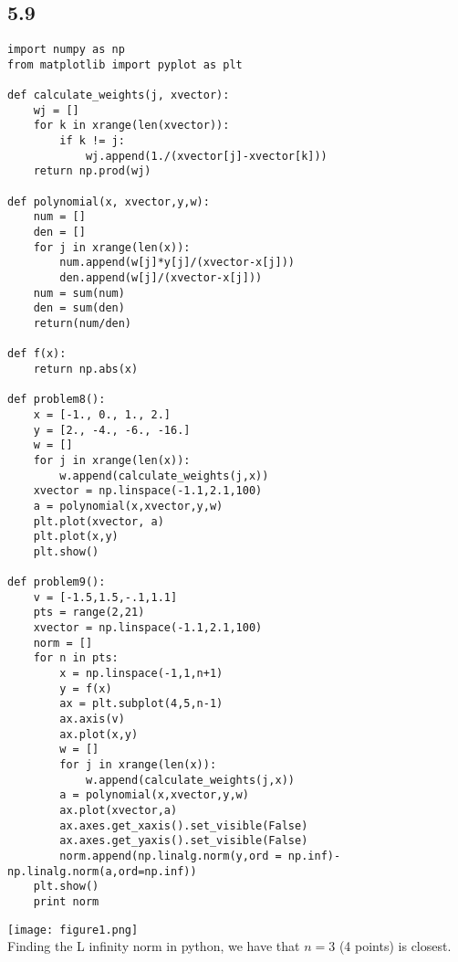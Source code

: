 \documentclass[letterpaper,12pt]{article}
\theoremstyle{definition}
\begin{document}
\subsection*{5.9}
\begin{lstlisting}
import numpy as np
from matplotlib import pyplot as plt

def calculate_weights(j, xvector):
    wj = []
    for k in xrange(len(xvector)):
        if k != j:
            wj.append(1./(xvector[j]-xvector[k]))
    return np.prod(wj)

def polynomial(x, xvector,y,w):
    num = []
    den = []
    for j in xrange(len(x)):
        num.append(w[j]*y[j]/(xvector-x[j]))
        den.append(w[j]/(xvector-x[j]))
    num = sum(num)
    den = sum(den)
    return(num/den)

def f(x):
    return np.abs(x)

def problem8():
    x = [-1., 0., 1., 2.]
    y = [2., -4., -6., -16.]
    w = []
    for j in xrange(len(x)):
        w.append(calculate_weights(j,x))
    xvector = np.linspace(-1.1,2.1,100)
    a = polynomial(x,xvector,y,w)
    plt.plot(xvector, a)
    plt.plot(x,y)
    plt.show()

def problem9():
    v = [-1.5,1.5,-.1,1.1]
    pts = range(2,21)
    xvector = np.linspace(-1.1,2.1,100)
    norm = []
    for n in pts:
        x = np.linspace(-1,1,n+1)
        y = f(x)
        ax = plt.subplot(4,5,n-1)
        ax.axis(v)
        ax.plot(x,y)
        w = []
        for j in xrange(len(x)):
            w.append(calculate_weights(j,x))
        a = polynomial(x,xvector,y,w)
        ax.plot(xvector,a)
        ax.axes.get_xaxis().set_visible(False)
        ax.axes.get_yaxis().set_visible(False)
        norm.append(np.linalg.norm(y,ord = np.inf)-np.linalg.norm(a,ord=np.inf))
    plt.show()
    print norm
\end{lstlisting}
\texttt{[image: figure1.png]}\\
Finding the L infinity norm in python, we have that $n=3$ (4 points) is closest. 
\end{document}
